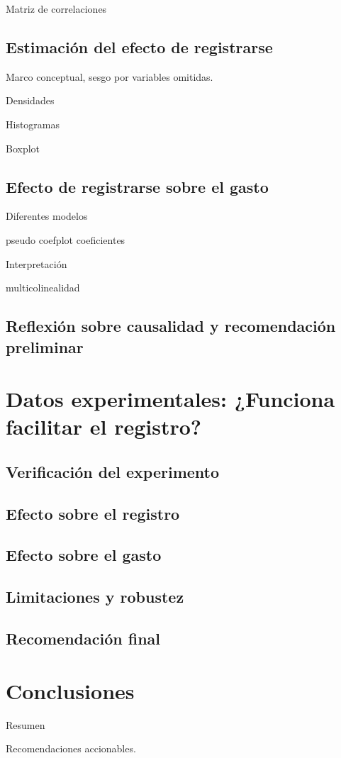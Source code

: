 \documentclass[conference]{IEEEtran}
\begin{document}
Matriz de correlaciones

\subsection{Estimación del efecto de registrarse}

Marco conceptual, sesgo por variables omitidas.


Densidades

Histogramas

Boxplot

\subsection{Efecto de registrarse sobre el gasto}


Diferentes modelos

pseudo coefplot coeficientes

Interpretación

multicolinealidad


\subsection{Reflexión sobre causalidad y recomendación preliminar}


\section{Datos experimentales: ¿Funciona facilitar el registro?}

\subsection{Verificación del experimento}

\subsection{Efecto sobre el registro}

\subsection{Efecto sobre el gasto}

\subsection{Limitaciones y robustez}

\subsection{Recomendación final}

\section{Conclusiones}

Resumen 

Recomendaciones accionables.
\end{document}
